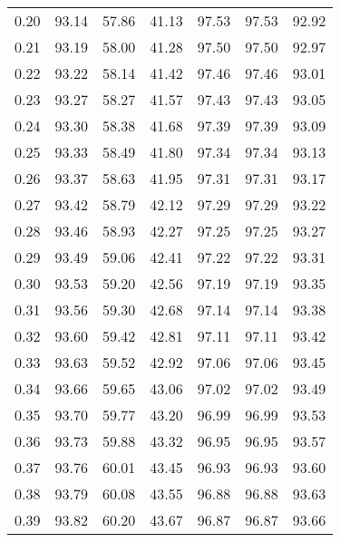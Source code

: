 \begin{tabular}{|c|c|c|c|c|c|c|}
      0.20 &     93.14 &     57.86 &      41.13 &   97.53 &      97.53 &         92.92 \\
      0.21 &     93.19 &     58.00 &      41.28 &   97.50 &      97.50 &         92.97 \\
      0.22 &     93.22 &     58.14 &      41.42 &   97.46 &      97.46 &         93.01 \\
      0.23 &     93.27 &     58.27 &      41.57 &   97.43 &      97.43 &         93.05 \\
      0.24 &     93.30 &     58.38 &      41.68 &   97.39 &      97.39 &         93.09 \\
      0.25 &     93.33 &     58.49 &      41.80 &   97.34 &      97.34 &         93.13 \\
      0.26 &     93.37 &     58.63 &      41.95 &   97.31 &      97.31 &         93.17 \\
      0.27 &     93.42 &     58.79 &      42.12 &   97.29 &      97.29 &         93.22 \\
      0.28 &     93.46 &     58.93 &      42.27 &   97.25 &      97.25 &         93.27 \\
      0.29 &     93.49 &     59.06 &      42.41 &   97.22 &      97.22 &         93.31 \\
      0.30 &     93.53 &     59.20 &      42.56 &   97.19 &      97.19 &         93.35 \\
      0.31 &     93.56 &     59.30 &      42.68 &   97.14 &      97.14 &         93.38 \\
      0.32 &     93.60 &     59.42 &      42.81 &   97.11 &      97.11 &         93.42 \\
      0.33 &     93.63 &     59.52 &      42.92 &   97.06 &      97.06 &         93.45 \\
      0.34 &     93.66 &     59.65 &      43.06 &   97.02 &      97.02 &         93.49 \\
      0.35 &     93.70 &     59.77 &      43.20 &   96.99 &      96.99 &         93.53 \\
      0.36 &     93.73 &     59.88 &      43.32 &   96.95 &      96.95 &         93.57 \\
      0.37 &     93.76 &     60.01 &      43.45 &   96.93 &      96.93 &         93.60 \\
      0.38 &     93.79 &     60.08 &      43.55 &   96.88 &      96.88 &         93.63 \\
      0.39 &     93.82 &     60.20 &      43.67 &   96.87 &      96.87 &         93.66 \\

\end{tabular}

